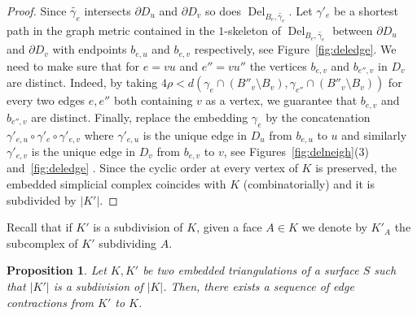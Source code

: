 \documentclass[11pt]{article}
\newtheorem{proposition}[theorem]{Proposition}
\numberwithin{claimcounter}{theorem}
\theoremstyle{remark}
\theoremstyle{definition}
\numberwithin{theorem}{section}
\DeclareMathOperator{\Del}{Del}
\begin{document}
\begin{proof}
    Since $\widetilde{\gamma_e}$ intersects $\partial D_u$ and $\partial D_v$ so does $\Del_{B_e,\widetilde{\gamma_e}}$. Let $\gamma'_e$  be a shortest path in the graph metric contained in the $1$-skeleton of $\Del_{B_e,\widetilde{\gamma_e}}$ between $\partial D_u$ and $\partial D_v$ with endpoints $b_{e,u}$ and $b_{e,v}$ respectively, see Figure~\ref{fig:deledge}. 
We need to make sure that for $e=vu$ and $e''=vu''$ the vertices $b_{e,v}$ and $b_{e'',v}$ in $D_v$ are distinct. Indeed, by taking $4\rho< d(\gamma_e\cap(B''_v\setminus B_v), \gamma_{e''}\cap(B''_v\setminus B_v))$ for every two edges $e,e''$ both containing $v$ as a vertex, we guarantee that $b_{e,v}$ and $b_{e'',v}$ are distinct.
    Finally, replace the embedding $\gamma_e$ by the concatenation $\gamma'_{e,u}\circ \gamma'_e\circ \gamma'_{e,v}$ where $\gamma'_{e,u}$ is the unique 
    edge in $D_u$ from $b_{e,u}$ to $u$ and similarly $\gamma'_{e,v}$ is the unique 
    edge in $D_v$ from $b_{e,v}$ to $v$, see Figures~\ref{fig:delneigh}(3) and~\ref{fig:deledge} . Since the cyclic order at every vertex of $K$ is preserved, the embedded simplicial complex coincides with $K$ (combinatorially) and it is subdivided by $|K'|$.
\end{proof}
%
%
Recall that if $K'$ is a subdivision of $K$, given a face $A\in K$ we denote by $K'_A$ the subcomplex of $K'$ subdividing $A$.
%
\begin{proposition}
  \label{p:minor}
  Let $K,K'$ be two embedded triangulations of a surface $S$ such that $|K'|$ is a subdivision of $|K|$.
  Then, there exists a sequence of edge contractions from $K'$ to $K$.
\end{proposition}
\end{document}
